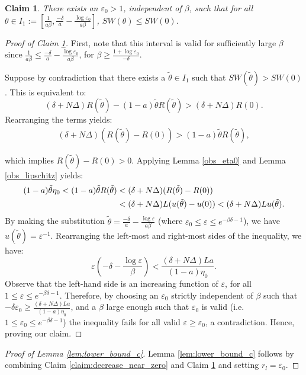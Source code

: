 \documentclass{article}
\newtheorem{claim}{Claim}
\begin{document}
\begin{claim} \label{claim:bound_away_from_zero}
There exists an $\varepsilon_0 > 1$, independent of $\beta$, such that for all $\theta \in I_1:=\left[\frac{1}{a\beta}, \frac{-\delta}{a} - \frac{\log \varepsilon_0}{a\beta}\right]$, $SW(\theta) \le SW(0)$.
\end{claim}
\begin{proof}[Proof of Claim \ref{claim:bound_away_from_zero}]
First, note that this interval is valid for sufficiently large $\beta$ since $\frac{1}{a\beta} \le \frac{-\delta}{a} - \frac{\log \varepsilon_0}{a\beta}$, for $\beta \ge \frac{1 + \log \varepsilon_0}{-\delta}$.

Suppose by contradiction that there exists a $\tilde{\theta} \in I_1$ such that $SW(\tilde{\theta}) > SW(0)$. This is equivalent to:
\[
(\delta + N\Delta)R(\tilde{\theta}) - (1-a) \tilde{\theta} R(\tilde{\theta}) > (\delta + N\Delta) R(0).
\]
Rearranging the terms yields:
\begin{align}
(\delta + N\Delta)(R(\tilde{\theta}) - R(0)) > (1-a)\tilde{\theta} R(\tilde{\theta}),\label{ineq:lower_bound} 
\end{align}

which implies $R(\tilde{\theta}) - R(0) > 0$. Applying Lemma \ref{obs_eta0} and Lemma \ref{obs_lipschitz} yields:
\begin{align}
    (1-a)\tilde{\theta} \eta_0 < (1-a)\tilde{\theta} R(\tilde{\theta}) &< (\delta + N\Delta)(R(\tilde{\theta}) - R(0)) \notag \\
    &< (\delta + N\Delta)L(u(\tilde{\theta}) - u(0)) < (\delta + N\Delta)Lu(\tilde{\theta}).\label{ineq:3sides}
\end{align}
By making the substitution $\tilde{\theta} = \frac{-\delta}{a} - \frac{\log \varepsilon}{a\beta}$ (where $\varepsilon_0 \le \varepsilon \le e^{-\beta\delta - 1}$), we have $ u(\tilde{\theta}) = \varepsilon^{-1}$. Rearranging the left-most and right-most sides of the inequality, we have:
\[
\varepsilon \left(-\delta- \frac{\log \varepsilon}{\beta}\right) < \frac{(\delta + N\Delta)La}{(1-a)\eta_0}.
\]
Observe that the left-hand side is an increasing function of $\varepsilon$, for all $1 \le \varepsilon \le e^{-\beta\delta - 1}$. Therefore, by choosing an $\varepsilon_0$ strictly independent of $\beta$ such that $-\delta \varepsilon_0 \ge \frac{(\delta + N\Delta)La}{(1-a)\eta_0}$, and a $\beta$ large enough such that $\varepsilon_0$ is valid (i.e. $1 \le \varepsilon_0 \le e^{-\beta\delta-1}$) the inequality fails for all valid $\varepsilon \ge \varepsilon_0$, a contradiction. Hence, proving our claim.
\end{proof}
\begin{proof}[Proof of Lemma \ref{lem:lower_bound_c}]
Lemma \ref{lem:lower_bound_c} follows by combining Claim \ref{claim:decrease_near_zero} and Claim \ref{claim:bound_away_from_zero} and
setting $r_l = \varepsilon_0$.
\end{proof}
\end{document}
